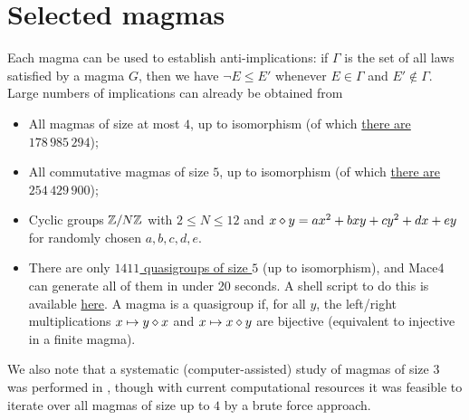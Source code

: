 \chapter{Selected magmas}\label{selected-magmas-chapter}

Each magma can be used to establish anti-implications: if $\Gamma$ is the set of all laws satisfied by a magma $G$, then we have $\neg E \leq E'$ whenever $E \in \Gamma$ and $E' \not \in \Gamma$.  Large numbers of implications can already be obtained from

\begin{itemize}
  \item All magmas of size at most $4$, up to isomorphism (of which \href{https://oeis.org/A001329}{there are $178\,985\,294$});
  \item All commutative magmas of size $5$, up to isomorphism (of which \href{https://oeis.org/A001425}{there are $254\,429\,900$});
  \item Cyclic groups $\mathbb{Z}/N\mathbb{Z}$ with $2 \leq N \leq 12$ and $x \diamond y = ax^2+bxy+cy^2+dx+ey$ for randomly chosen $a,b,c,d,e$.
  \item There are only \href{https://oeis.org/A057991}{$1411$ quasigroups of size $5$} (up to isomorphism), and Mace4 can generate all of them in under 20 seconds. A shell script to do this is available \href{https://github.com/zaklogician/equational_theories/tree/cancellative_magmas/scripts/cancellative_magmas}{here}. A magma is a quasigroup if, for all $y$, the left/right multiplications $x\mapsto y\diamond x$ and $x\mapsto x\diamond y$ are bijective (equivalent to injective in a finite magma).
\end{itemize}

We also note that a systematic (computer-assisted) study of magmas of size $3$ was performed in \cite{berman-burris}, though with current computational resources it was feasible to iterate over all magmas of size up to $4$ by a brute force approach.

